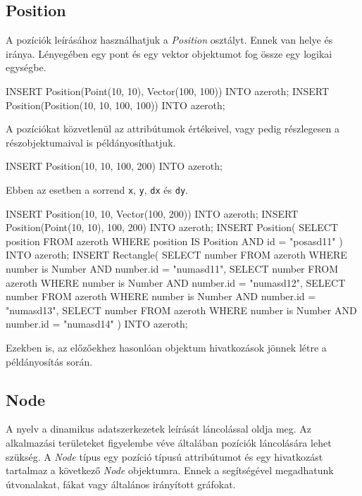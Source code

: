 \subsection{Position}

A pozíciók leírásához használhatjuk a \textit{Position} osztályt. Ennek van helye és iránya. Lényegében egy pont és egy vektor objektumot fog össze egy logikai egységbe.

\begin{sql}
INSERT Position(Point(10, 10), Vector(100, 100)) INTO azeroth;
INSERT Position(Position(10, 10, 100, 100)) INTO azeroth;
\end{sql}

A pozíciókat közvetlenül az attribútumok értékeivel, vagy pedig részlegesen a részobjektumaival is példányosíthatjuk.

\begin{sql}
INSERT Position(10, 10, 100, 200) INTO azeroth;
\end{sql}

Ebben az esetben a sorrend \texttt{x}, \texttt{y}, \texttt{dx} és \texttt{dy}. 

\begin{sql}
INSERT Position(10, 10, Vector(100, 200)) INTO azeroth;
INSERT Position(Point(10, 10), 100, 200) INTO azeroth;
INSERT Position(
    SELECT position FROM azeroth
    WHERE position IS Position AND id = "posasd11"
) INTO azeroth;
INSERT Rectangle(
    SELECT number FROM azeroth
    WHERE number is Number AND number.id = "numasd11",
    SELECT number FROM azeroth
    WHERE number is Number AND number.id = "numasd12",
    SELECT number FROM azeroth
    WHERE number is Number AND number.id = "numasd13",
    SELECT number FROM azeroth
    WHERE number is Number AND number.id = "numasd14"
) INTO azeroth;
\end{sql}

Ezekben is, az előzőekhez hasonlóan objektum hivatkozások jönnek létre a példányosítás során.

\subsection{Node}

A nyelv a dinamikus adatszerkezetek leírását láncolással oldja meg. Az alkalmazási területeket figyelembe véve általában pozíciók láncolására lehet szükség. A \textit{Node} típus egy pozíció típusú attribútumot és egy hivatkozást tartalmaz a következő \textit{Node} objektumra. Ennek a segítségével megadhatunk útvonalakat, fákat vagy általános irányított gráfokat.

